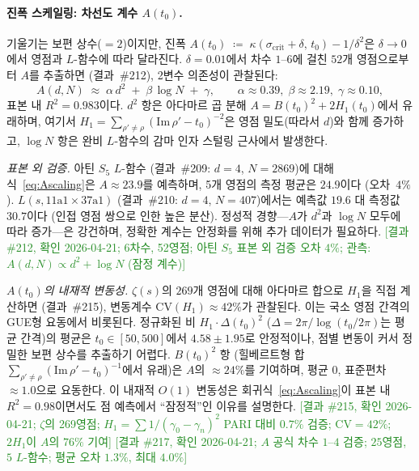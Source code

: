 \documentclass[11pt, a4paper]{article}
\theoremstyle{plain}
\theoremstyle{definition}
\begin{document}
\paragraph{진폭 스케일링: 차선도 계수 $A(t_{0})$.}
기울기는 보편 상수($=2$)이지만, 진폭
$A(t_{0}) \;\coloneqq\; \kappa(\sigma_{\mathrm{crit}}+\delta,\,t_{0}) - 1/\delta^{2}$은
$\delta\to 0$에서 영점과 $L$-함수에 따라 달라진다.
$\delta=0.01$에서 차수 $1$--$6$에 걸친 $52$개 영점으로부터 $A$를 추출하면
(결과~\#212), 2변수 의존성이 관찰된다:
\begin{equation}\label{eq:Ascaling}
  A(d,N) \;\approx\; \alpha\,d^{2} \;+\; \beta\,\log N \;+\; \gamma,
  \qquad \alpha\approx 0.39,\;\beta\approx 2.19,\;\gamma\approx 0.10,
\end{equation}
표본 내 $R^{2}=0.983$이다. $d^{2}$ 항은 아다마르 곱 분해
$A = B(t_{0})^{2} + 2H_{1}(t_{0})$에서 유래하며,
여기서 $H_{1}=\sum_{\rho'\neq\rho}(\mathrm{Im}\,\rho'-t_{0})^{-2}$은
영점 밀도(따라서 $d$)와 함께 증가하고, $\log N$ 항은 완비
$L$-함수의 감마 인자 스털링 근사에서 발생한다.

\emph{표본 외 검증.}  아틴 $S_5$ $L$-함수
(결과~\#209: $d=4$, $N=2869$)에 대해 식~\eqref{eq:Ascaling}은
$A\approx 23.9$를 예측하며, 5개 영점의 측정 평균은 $24.9$이다 (오차~$4\%$).
$L(s,\text{11a1}\times\text{37a1})$ (결과~\#210: $d=4$, $N=407$)에서는
예측값 $19.6$ 대 측정값~$30.7$이다 (인접 영점 쌍으로 인한 높은 분산).
정성적 경향---$A$가 $d^{2}$과 $\log N$ 모두에 따라 증가---은 강건하며,
정확한 계수는 안정화를 위해 추가 데이터가 필요하다.
\textcolor{ForestGreen}{[결과 \#212, 확인 2026-04-21;
6차수, 52영점; 아틴 $S_5$ 표본 외 검증 오차 $4\%$;
관측: $A(d,N)\propto d^{2}+\log N$ (잠정 계수)]}

\emph{$A(t_0)$의 내재적 변동성.}  $\zeta(s)$의 $269$개 영점에 대해
아다마르 합으로 $H_1$을 직접 계산하면 (결과~\#215), 변동계수
$\mathrm{CV}(H_1)\approx 42\%$가 관찰된다. 이는 국소 영점 간격의
GUE형 요동에서 비롯된다.  정규화된 비 $H_1\cdot\Delta(t_0)^2$
($\Delta=2\pi/\log(t_0/2\pi)$는 평균 간격)의 평균은 $t_0\in[50,500]$에서
$4.58\pm 1.95$로 안정적이나, 점별 변동이 커서 정밀한 보편 상수를 추출하기
어렵다.  $B(t_0)^2$ 항 (힐베르트형 합
$\sum_{\rho'\neq\rho}(\mathrm{Im}\,\rho'-t_0)^{-1}$에서 유래)은 $A$의
${\approx}24\%$를 기여하며, 평균 0, 표준편차 ${\approx}1.0$으로 요동한다.
이 내재적 $O(1)$ 변동성은 회귀식~\eqref{eq:Ascaling}이 표본 내
$R^2=0.98$이면서도 점 예측에서 ``잠정적''인 이유를 설명한다.
\textcolor{ForestGreen}{[결과 \#215, 확인 2026-04-21;
$\zeta$의 269영점; $H_1=\sum 1/(\gamma_0-\gamma_n)^2$ PARI 대비
$0.7\%$ 검증; CV$=42\%$; $2H_1$이 $A$의 $76\%$ 기여]}
\textcolor{ForestGreen}{[결과 \#217, 확인 2026-04-21;
$A$ 공식 차수 $1$--$4$ 검증; $25$영점, $5$ $L$-함수;
평균 오차 $1.3\%$, 최대 $4.0\%$]}
\end{document}

